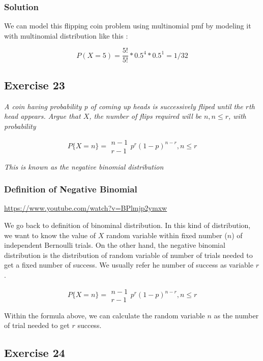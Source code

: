\documentclass[12pt,a4paper]{article}
\begin{document}
\subsubsection{Solution}

We can model this flipping coin problem using multinomial pmf by modeling it with multinomial distribution like this :

\[
P(X=5) = \frac{5!}{5!} * 0.5^4 * 0.5^1 = 1/32
\]

\subsection{Exercise 23}

\textit{A coin having probability p of coming up heads is successively fliped until the $r$th head appears. Argue that $X$, the number of flips required will be $n, n \leq r$, with probability }

\[
P\{X=n\} = \begin{array}{c}n-1\\r-1\end{array}p^r(1-p)^{n-r}, n \leq r
\]

\textit{This is known as the negative binomial distribution}

\subsubsection{Definition of Negative Binomial}

\url{https://www.youtube.com/watch?v=BPlmjp2ymxw}

We go back to definition of binominal distribution. In this kind of distribution, we want to know the value of $X$ random variable within fixed number ($n$) of independent Bernoulli trials. On the other hand, the negative binomial distribution is the distribution of random variable of number of trials needed to get a fixed number of success. We usually refer he number of success as variable $r$.

\[
P\{X=n\} = \begin{array}{c}n-1\\r-1\end{array}p^r(1-p)^{n-r}, n \leq r
\]

Within the formula above, we can calculate the random variable $n$ as the number of trial needed to get $r$ success.

\subsection{Exercise 24}
\end{document}
